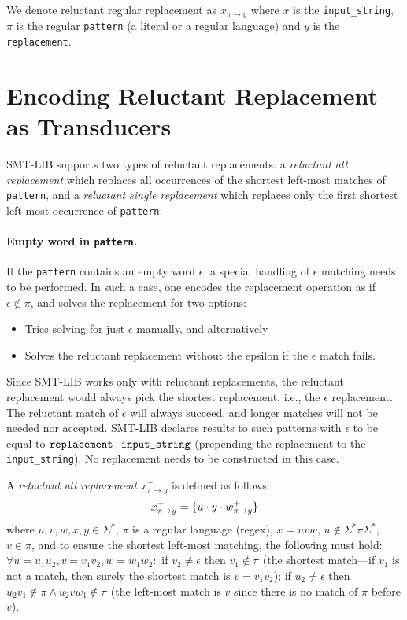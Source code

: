 We denote reluctant regular replacement as $x_{\pi \rightarrow y}$ where $x$ is the \texttt{input\_string}, $\pi$ is the regular \texttt{pattern} (a literal or a regular language) and $y$ is the \texttt{replacement}.

\section{Encoding Reluctant Replacement as Transducers}

SMT-LIB supports two types of reluctant replacements: a \emph{reluctant all replacement} which replaces all occurrences of the shortest left-most matches of \texttt{pattern}, and a \emph{reluctant single replacement} which replaces only the first shortest left-most occurrence of \texttt{pattern}.

\paragraph{Empty word in \texttt{pattern}.}
If the \texttt{pattern} contains an empty word $\epsilon$, a special handling of $\epsilon$ matching needs to be performed. In such a case, one encodes the replacement operation as if $\epsilon \notin \pi$, and solves the replacement for two options:
\begin{itemize}
  \item Tries solving for just $\epsilon$ manually, and alternatively
  \item Solves the reluctant replacement without the epsilon if the $\epsilon$ match fails.
\end{itemize}
Since SMT-LIB works only with reluctant replacements, the reluctant replacement would always pick the shortest replacement, i.e., the $\epsilon$ replacement. The reluctant match of $\epsilon$ will always succeed, and longer matches will not be needed nor accepted. SMT-LIB declares results to such patterns with $\epsilon$ to be equal to $\texttt{replacement} \cdot \texttt{input\_string}$ (prepending the replacement to the \texttt{input\_string}).
No replacement \nft needs to be constructed in this case.


\begin{definition} \hfill \newline
  A \emph{reluctant all replacement} $x^{+}_{\pi \rightarrow y}$ is defined as follows: \newline
  $$x^{+}_{\pi \rightarrow y} = \{ u \cdot y \cdot w^{+}_{\pi \rightarrow y} \}$$
  where $u, v, w, x, y \in \Sigma^*$, $\pi$ is a regular language (regex), $x = u v w$, $u \notin \Sigma^* \pi \Sigma^*$, $v \in \pi$, and to ensure the shortest left-most matching, the following must hold: $\forall u = u_1 u_2, v = v_1 v_2, w = w_1 w_2:$ if $v_2 \neq \epsilon$ then $v_1 \notin \pi$ (the shortest match---if $v_1$ is not a match, then surely the shortest match is $v = v_1v_2$);
  if $u_2 \neq \epsilon$ then $u_2 v_1 \notin \pi \land u_2 v w_1 \notin \pi$ (the left-most match is $v$ since there is no match of $\pi$ before $v$).
\end{definition}


